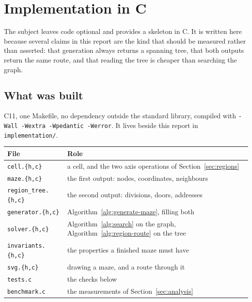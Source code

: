 \section{Implementation in C}
\label{sec:implementation}

The subject leaves code optional and provides a skeleton in C. It is written
here because several claims in this report are the kind that should be measured
rather than asserted: that generation always returns a spanning tree, that both
outputs return the same route, and that reading the tree is cheaper than
searching the graph.

\subsection{What was built}

C11, one Makefile, no dependency outside the standard library, compiled with
\texttt{-Wall -Wextra -Wpedantic -Werror}. It lives beside this report in
\texttt{implementation/}.

\begin{center}
\begin{tabular}{@{}ll@{}}
  \toprule
  File & Role \\
  \midrule
  \texttt{cell.\{h,c\}}        & a cell, and the two axis operations of
                                 Section~\ref{sec:regions} \\
  \texttt{maze.\{h,c\}}        & the first output: nodes, coordinates, neighbours \\
  \texttt{region\_tree.\{h,c\}} & the second output: divisions, doors, addresses \\
  \texttt{generator.\{h,c\}}   & Algorithm~\ref{alg:generate-maze}, filling both \\
  \texttt{solver.\{h,c\}}      & Algorithm~\ref{alg:search} on the graph,
                                 Algorithm~\ref{alg:region-route} on the tree \\
  \texttt{invariants.\{h,c\}}  & the properties a finished maze must have \\
  \texttt{svg.\{h,c\}}         & drawing a maze, and a route through it \\
  \texttt{tests.c}             & the checks below \\
  \texttt{benchmark.c}         & the measurements of Section~\ref{sec:analysis} \\
  \bottomrule
\end{tabular}
\end{center}

